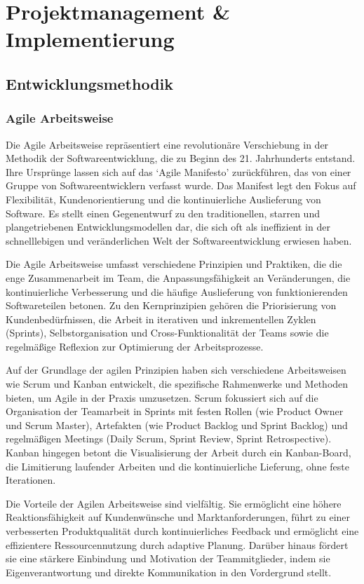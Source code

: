 \section{Projektmanagement \& Implementierung}

\subsection{Entwicklungsmethodik}

\subsubsection{Agile Arbeitsweise}

Die Agile Arbeitsweise repräsentiert eine revolutionäre Verschiebung in der Methodik der Softwareentwicklung, die zu Beginn des 21.
Jahrhunderts entstand. Ihre Ursprünge lassen sich auf das `Agile Manifesto' zurückführen, das von einer Gruppe von Softwareentwicklern
verfasst wurde. Das Manifest legt den Fokus auf Flexibilität, Kundenorientierung und die kontinuierliche Auslieferung von Software. Es
stellt einen Gegenentwurf zu den traditionellen, starren und plangetriebenen Entwicklungsmodellen dar, die sich oft als ineffizient in
der schnelllebigen und veränderlichen Welt der Softwareentwicklung erwiesen haben.

Die Agile Arbeitsweise umfasst verschiedene Prinzipien und Praktiken, die die enge Zusammenarbeit im Team, die Anpassungsfähigkeit an
Veränderungen, die kontinuierliche Verbesserung und die häufige Auslieferung von funktionierenden Softwareteilen betonen. Zu den
Kernprinzipien gehören die Priorisierung von Kundenbedürfnissen, die Arbeit in iterativen und inkrementellen Zyklen (Sprints),
Selbstorganisation und Cross-Funktionalität der Teams sowie die regelmäßige Reflexion zur Optimierung der Arbeitsprozesse.

Auf der Grundlage der agilen Prinzipien haben sich verschiedene Arbeitsweisen wie Scrum und Kanban entwickelt, die spezifische
Rahmenwerke und Methoden bieten, um Agile in der Praxis umzusetzen. Scrum fokussiert sich auf die Organisation der Teamarbeit in
Sprints mit festen Rollen (wie Product Owner und Scrum Master), Artefakten (wie Product Backlog und Sprint Backlog) und regelmäßigen
Meetings (Daily Scrum, Sprint Review, Sprint Retrospective). Kanban hingegen betont die Visualisierung der Arbeit durch ein Kanban-Board,
die Limitierung laufender Arbeiten und die kontinuierliche Lieferung, ohne feste Iterationen.

Die Vorteile der Agilen Arbeitsweise sind vielfältig. Sie ermöglicht eine höhere Reaktionsfähigkeit auf Kundenwünsche und Marktanforderungen,
führt zu einer verbesserten Produktqualität durch kontinuierliches Feedback und ermöglicht eine effizientere Ressourcennutzung durch adaptive
Planung. Darüber hinaus fördert sie eine stärkere Einbindung und Motivation der Teammitglieder, indem sie Eigenverantwortung und direkte
Kommunikation in den Vordergrund stellt.

